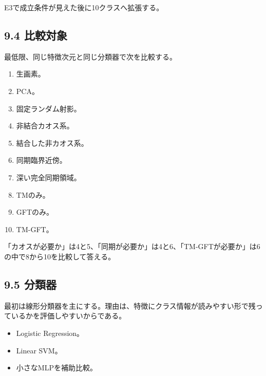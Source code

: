 \documentclass[11pt,a4paper]{ltjsarticle}
\begin{document}
E3で成立条件が見えた後に10クラスへ拡張する。\par

\subsection*{\textcolor{researchblue}{9.4 比較対象}}

最低限、同じ特徴次元と同じ分類器で次を比較する。\par

\begin{enumerate}

\item 生画素。

\item PCA。

\item 固定ランダム射影。

\item 非結合カオス系。

\item 結合した非カオス系。

\item 同期臨界近傍。

\item 深い完全同期領域。

\item TMのみ。

\item GFTのみ。

\item TM-GFT。

\end{enumerate}

「カオスが必要か」は4と5、「同期が必要か」は4と6、「TM-GFTが必要か」は6の中で8から10を比較して答える。\par

\subsection*{\textcolor{researchblue}{9.5 分類器}}

最初は線形分類器を主にする。理由は、特徴にクラス情報が読みやすい形で残っているかを評価しやすいからである。\par

\begin{itemize}

\item Logistic Regression。

\item Linear SVM。

\item 小さなMLPを補助比較。

\end{itemize}
\end{document}
